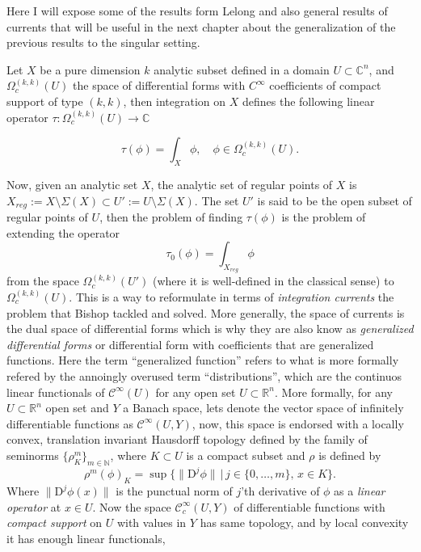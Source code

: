 \documentclass[12pt,twoside,a4paper]{report}
\newcommand{\nat}{\ensuremath{ \mathbb N }}
\newcommand{\re}{\ensuremath{\mathbb R }}
\newcommand{\co}{\ensuremath{\mathbb C }}
\newcommand{\om}{\ensuremath{\Omega}}
\newcommand{\sig}{\ensuremath{\Sigma}}
\newcommand{\csheaf}{\ensuremath{\mathcal C }}
\begin{document}
\noindent Here I will expose some of the results form Lelong and also general results of currents that will be useful in the next chapter about the generalization of the previous results to the singular setting. 

Let $X$ be a pure dimension $k$ analytic subset defined in a domain $U\subset\mathbb{C}^n$, and $\om^{(k,k)}_c(U)$ the space of differential forms with $C^{\infty}$ coefficients of compact support of type $(k,k)$, then integration on $X$ defines the following linear operator $\tau:\om^{(k,k)}_c(U)\to\co$

\begin{equation}\label{integration-current}
    \tau(\phi)=\int_{X}\phi,\quad\phi\in\om^{(k,k)}_c(U).
\end{equation}

Now, given an analytic set $X$, the analytic set of regular points of $X$ is $X_{reg}:=X\setminus \sig(X)\subset U':=U\setminus \sig(X)$. The set $U'$ is said to be the open subset of regular points of $U$, then the problem of finding $\tau(\phi)$ is the problem of extending the operator
\[
    \tau_0(\phi)=\int_{X_{reg}}\phi
\]
from the space $\om^{(k,k)}_c(U')$ (where it is well-defined in the classical sense) to $\om^{(k,k)}_c(U)$. This is a way to reformulate in terms of \emph{integration currents} the problem that Bishop tackled and solved. More generally, the space of currents is the dual space of differential forms which is why they are also know as \emph{generalized differential forms} or differential form with coefficients that are generalized functions. Here the term ``generalized function'' refers to what is more formally refered by the annoingly overused term ``distributions'', which are the continuos linear functionals of $\csheaf^{\infty}(U)$ for any open set $U\subset\re^n$. More formally, for any $U\subset\re^n$ open set and $Y$ a Banach space, lets denote the vector space of infinitely differentiable functions as $\csheaf^{\infty}(U,Y)$, now, this space is endorsed with a locally convex, translation invariant Hausdorff topology defined by the family of seminorms $\{\rho^{m}_K\}_{m\in\nat}$, where $K\subset U$ is a compact subset and $\rho$ is defined by
\[
  \rho^{m}(\phi)_K=\sup\{\|\mathrm{D}^j\phi\|\,|\,j\in\{0,\dots,m\},\,x\in K\}.
\]
Where $\|\mathrm{D}^j\phi(x)\|$ is the punctual norm of $j$'th derivative of $\phi$ as a \emph{linear operator} at $x\in U$. Now the space $\csheaf^{\infty}_c(U,Y)$ of differentiable functions with \emph{compact support} on $U$ with values in $Y$ has same topology, and by local convexity it has enough linear functionals,
\end{document}
